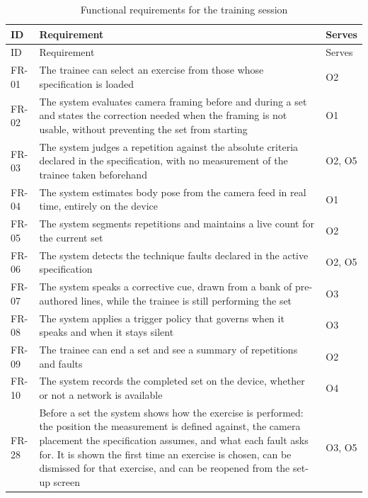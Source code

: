 {\small
\setlength{\LTpre}{6pt}\setlength{\LTpost}{8pt}
\begin{longtable}{>{\raggedright\arraybackslash}p{}>{\raggedright\arraybackslash}p{}>{\raggedright\arraybackslash}p{}}
\caption{Functional requirements for the training session}\\
\toprule
ID & Requirement & Serves \\
\midrule
\endfirsthead
\toprule
ID & Requirement & Serves \\
\midrule
\endhead
\bottomrule
\endfoot
\bottomrule
\endlastfoot
FR-01 & The trainee can select an exercise from those whose specification is loaded & O2 \\
FR-02 & The system evaluates camera framing before and during a set and states the correction needed when the framing is not usable, without preventing the set from starting & O1 \\
FR-03 & The system judges a repetition against the absolute criteria declared in the specification, with no measurement of the trainee taken beforehand & O2, O5 \\
FR-04 & The system estimates body pose from the camera feed in real time, entirely on the device & O1 \\
FR-05 & The system segments repetitions and maintains a live count for the current set & O2 \\
FR-06 & The system detects the technique faults declared in the active specification & O2, O5 \\
FR-07 & The system speaks a corrective cue, drawn from a bank of pre-authored lines, while the trainee is still performing the set & O3 \\
FR-08 & The system applies a trigger policy that governs when it speaks and when it stays silent & O3 \\
FR-09 & The trainee can end a set and see a summary of repetitions and faults & O2 \\
FR-10 & The system records the completed set on the device, whether or not a network is available & O4 \\
FR-28 & Before a set the system shows how the exercise is performed: the position the measurement is defined against, the camera placement the specification assumes, and what each fault asks for. It is shown the first time an exercise is chosen, can be dismissed for that exercise, and can be reopened from the set-up screen & O3, O5 \\
\end{longtable}
}


